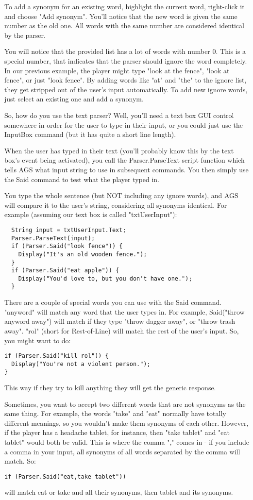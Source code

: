 To add a synonym for an existing word, highlight the current word, right-click it
and choose "Add synonym". You'll notice that the new word is given the same
number as the old one. All words with the same number are considered identical
by the parser.

You will notice that the provided list has a lot of words with number 0. This
is a special number, that indicates that the parser should ignore the word
completely. In our previous example, the player might type "look at the fence",
"look at fence", or just "look fence". By adding words like "at" and "the" to
the ignore list, they get stripped out of the user's input automatically. To
add new ignore words, just select an existing one and add a synonym.

So, how do you use the text parser? Well, you'll need a text box GUI control
somewhere in order for the user to type in their input, or you could just
use the InputBox command (but it has quite a short line length).

When the user has typed in their text (you'll probably know this by the text
box's event being activated), you call the  Parser.ParseText  script
function which tells AGS what input string to use in subsequent commands.
You then simply use the Said command to test what the player typed in.

You type the whole sentence (but NOT including any ignore words), and AGS will
compare it to the user's string, considering all synonyms identical.
For example (assuming our text box is called "txtUserInput"):
\begin{verbatim}
  String input = txtUserInput.Text;
  Parser.ParseText(input);
  if (Parser.Said("look fence")) {
    Display("It's an old wooden fence.");
  }
  if (Parser.Said("eat apple")) {
    Display("You'd love to, but you don't have one.");
  }
\end{verbatim}
There are a couple of special words you can use with the Said command.
"anyword" will match any word that the user types in. For example,
Said("throw anyword away")  will match if they type "throw dagger away",
or "throw trash away".
"rol" (short for Rest-of-Line) will match the rest of the user's input. So,
you might want to do:
\begin{verbatim}
if (Parser.Said("kill rol")) {
  Display("You're not a violent person.");
}
\end{verbatim}
This way if they try to kill anything they will get the generic response.

Sometimes, you want to accept two different words that are not synonyms as
the same thing. For example, the words "take" and "eat" normally have totally
different meanings, so you wouldn't make them synonyms of each other. However,
if the player has a headache tablet, for instance, then "take tablet" and
"eat tablet" would both be valid. This is where the comma "," comes in - if
you include a comma in your input, all synonyms of all words separated by
the comma will match. So:
\begin{verbatim}
if (Parser.Said("eat,take tablet"))
\end{verbatim}
will match eat or take and all their synonyms, then tablet and its synonyms.


